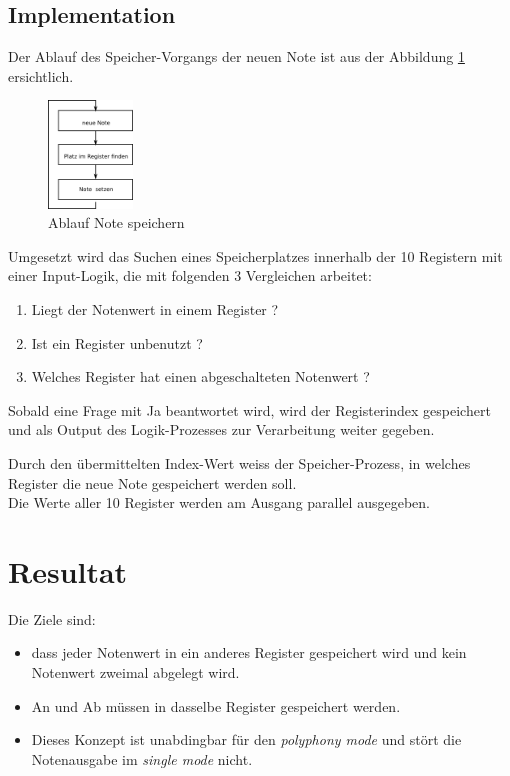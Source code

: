 \subsection{Implementation}

Der Ablauf des Speicher-Vorgangs der neuen Note ist aus der Abbildung \ref{fig.polyphnie_ablauf} ersichtlich.

\begin{figure}[H]
	\includegraphics[width=0.2\textwidth]{images/midi_interface/polyphnie_ablauf.png}
	\caption{Ablauf Note speichern }
	\label{fig.polyphnie_ablauf}
\end{figure}

Umgesetzt wird das Suchen eines Speicherplatzes innerhalb der 10 Registern mit einer Input-Logik, die mit folgenden 3 Vergleichen arbeitet:

\begin{enumerate}
	\item Liegt der Notenwert in einem Register ? 
	\item Ist ein Register unbenutzt ?
	\item Welches Register hat einen abgeschalteten Notenwert ?
\end{enumerate}

Sobald eine Frage mit Ja beantwortet wird, wird der Registerindex gespeichert und als Output des Logik-Prozesses zur Verarbeitung weiter gegeben.

Durch den übermittelten Index-Wert weiss der Speicher-Prozess, in welches Register die neue Note gespeichert werden soll.\\
Die Werte aller 10 Register werden am Ausgang parallel ausgegeben.

\section{Resultat}\label{test_polypohne}

Die Ziele sind:

\begin{itemize}
    \item dass jeder Notenwert in ein anderes Register gespeichert wird und kein Notenwert zweimal abgelegt wird.
    \item An und Ab müssen in dasselbe Register gespeichert werden.
    \item Dieses Konzept ist unabdingbar für den \textit{polyphony mode} und stört die Notenausgabe im \textit{single mode} nicht. 
\end{itemize}


